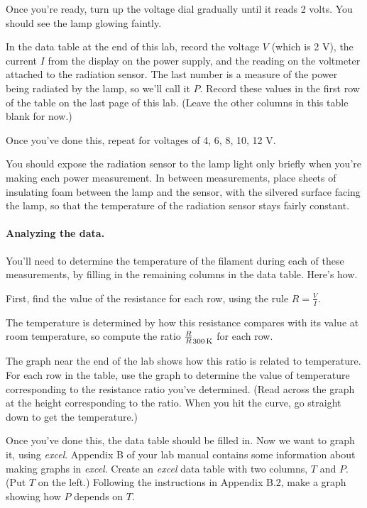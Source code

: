 Once you're ready, turn up the voltage dial gradually until it reads 2 volts.
You should see the lamp glowing faintly.

In the data table at the end of this lab, record the voltage $V$ (which is 2 V),
the current $I$ from the display on the power supply,
and the reading on the voltmeter
attached to the radiation sensor. The last number is a measure
of the power being radiated by the lamp, so we'll call it $P$. 
Record these values
in the first row of the table on the last page of this lab. (Leave
the other columns in this table blank for now.)

Once you've done this, repeat for voltages of 4, 6, 8, 10, 12 V.

You should expose the radiation sensor to the lamp light only briefly
when you're making each power measurement. In between measurements, place 
sheets of insulating foam between the lamp and the sensor, with the silvered
surface facing the lamp, so that the temperature of the radiation sensor
stays fairly constant.


\paragraph{Analyzing the data.}
You'll need to determine the temperature of the filament during each of these
measurements, by filling in the remaining columns in the data table. Here's
how. 

First, find the value of the resistance for each row, using the rule $R={\frac{V} 
I}$. 

The temperature is determined by how this resistance compares with its
value at room temperature, so compute the ratio ${\frac{R} R_{300\,{\rm K}}}$
for each row.

The graph near the end of the lab 
shows how this ratio is related to temperature.
For each row in the table, use the graph to determine the value of 
temperature corresponding to the resistance ratio you've determined.
(Read across the graph at the height corresponding to the ratio.
When you hit the curve, go straight down to get the temperature.)

Once you've done this, the data table should be filled in.
Now we want to graph it, using \textit{excel}. Appendix B of your
lab manual contains some information about making graphs in \textit{excel}.
Create an \textit{excel} data table with two columns, $T$ and $P$. (Put
$T$ on the left.) Following the instructions in Appendix B.2, make
a graph showing how $P$ depends on $T$. 

